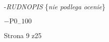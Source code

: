 \documentclass[a4paper,12pt]{article}
\begin{document}
-{\it RUDNOPIS} \{{\it nie podlega ocenie}\}

$-\mathrm{P}0_{-}100$

Strona 9 z25
\end{document}
